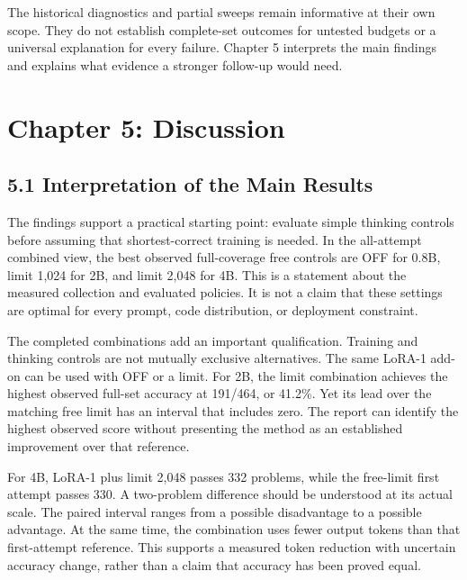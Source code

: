 \documentclass[11pt,letterpaper]{article}
\begin{document}
The historical diagnostics and partial sweeps remain informative at their own scope. They do not establish complete-set outcomes for untested budgets or a universal explanation for every failure. Chapter 5 interprets the main findings and explains what evidence a stronger follow-up would need.\par

\clearpage

\section*{Chapter 5: Discussion}

\subsection*{5.1 Interpretation of the Main Results}

The findings support a practical starting point: evaluate simple thinking controls before assuming that shortest-correct training is needed. In the all-attempt combined view, the best observed full-coverage free controls are OFF for 0.8B, limit 1,024 for 2B, and limit 2,048 for 4B. This is a statement about the measured collection and evaluated policies. It is not a claim that these settings are optimal for every prompt, code distribution, or deployment constraint.\par

The completed combinations add an important qualification. Training and thinking controls are not mutually exclusive alternatives. The same LoRA-1 add-on can be used with OFF or a limit. For 2B, the limit combination achieves the highest observed full-set accuracy at 191/464, or 41.2\%. Yet its lead over the matching free limit has an interval that includes zero. The report can identify the highest observed score without presenting the method as an established improvement over that reference.\par

For 4B, LoRA-1 plus limit 2,048 passes 332 problems, while the free-limit first attempt passes 330. A two-problem difference should be understood at its actual scale. The paired interval ranges from a possible disadvantage to a possible advantage. At the same time, the combination uses fewer output tokens than that first-attempt reference. This supports a measured token reduction with uncertain accuracy change, rather than a claim that accuracy has been proved equal.\par
\end{document}
